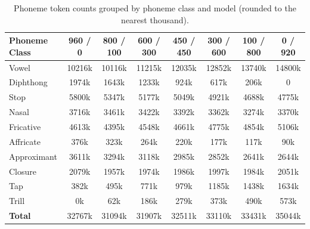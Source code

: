 \newpage
\fi

\begin{table}[h]
\centering
\begin{tabular}{l|ccccccc}
\toprule
Phoneme Class & 960 / 0 & 800 / 100 & 600 / 300 & 450 / 450 & 300 / 600 & 100 / 800 & 0 / 920 \\
\midrule
Vowel & 10216k & 10116k & 11215k & 12035k & 12852k & 13740k & 14800k \\
Diphthong & 1974k & 1643k & 1233k & 924k & 617k & 206k & 0 \\
Stop & 5800k & 5347k & 5177k & 5049k & 4921k & 4688k & 4775k \\
Nasal & 3716k & 3461k & 3422k & 3392k & 3362k & 3274k & 3370k \\
Fricative & 4613k & 4395k & 4548k & 4661k & 4775k & 4854k & 5106k \\
Affricate & 376k & 323k & 264k & 220k & 177k & 117k & 90k \\
Approximant & 3611k & 3294k & 3118k & 2985k & 2852k & 2641k & 2644k \\
Closure & 2079k & 1957k & 1974k & 1986k & 1997k & 1984k & 2051k \\
Tap & 382k & 495k & 771k & 979k & 1185k & 1438k & 1634k \\
Trill & 0k & 62k & 186k & 279k & 373k & 490k & 573k \\
\addlinespace
\textbf{Total} & 32767k & 31094k & 31907k & 32511k & 33110k & 33431k & 35044k \\
\bottomrule
\end{tabular}
\caption{Phoneme token counts grouped by phoneme class and model (rounded to the nearest thousand).}
\label{app_tab:phoneme_token_class_counts_k}
\end{table}
\clearpage



